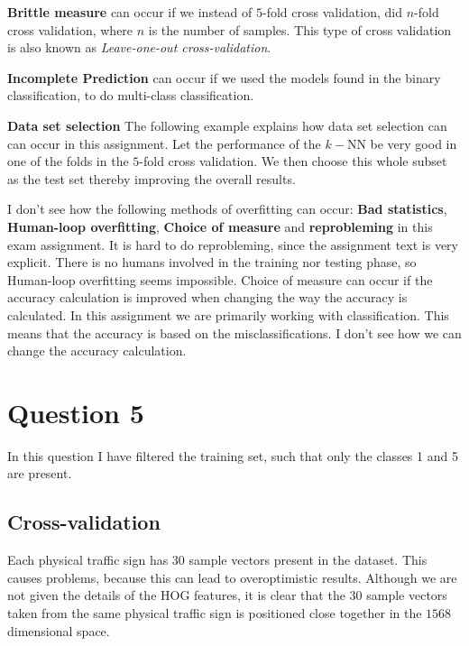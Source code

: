 \documentclass[10pt]{article}
\begin{document}
\textbf{Brittle measure} can occur if we instead of $5$-fold cross validation, did $n$-fold cross validation, where $n$ is the number of samples. This type of cross validation is also known as \emph{Leave-one-out cross-validation}.

\textbf{Incomplete Prediction} can occur if we used the models found in the binary classification, to do multi-class classification.

\textbf{Data set selection} The following example explains how data set selection can can occur in this assignment. Let the performance of the $k-$NN be very good in one of the folds in the $5$-fold cross validation. We then choose this whole subset as the test set thereby improving the overall results.                                                                                                                                              

I don't see how the following methods of overfitting can occur: \textbf{Bad statistics}, \textbf{Human-loop overfitting}, \textbf{Choice of measure} and \textbf{reprobleming} in this exam assignment. It is hard to do reprobleming, since the assignment text is very explicit. There is no humans involved in the training nor testing phase, so Human-loop overfitting seems impossible. 
Choice of measure can occur if the accuracy calculation is improved when changing the way the accuracy is calculated. In this assignment we are primarily working with classification. This means that the accuracy is based on the misclassifications. I don't see how we can change the accuracy calculation.                                                                     



\section*{Question 5} %
\label{sec:question_5}
In this question I have filtered the training set, such that only the classes 1 and 5 are present.
\subsection*{Cross-validation} %
\label{sub:cross_validation}
Each physical traffic sign has $30$ sample vectors present in the dataset. This causes problems, because this can lead to overoptimistic results. Although we are not given the details of the HOG features, it is clear that the $30$ sample vectors taken from the same physical traffic sign is positioned close together in the $1568$ dimensional space. 
\end{document}
